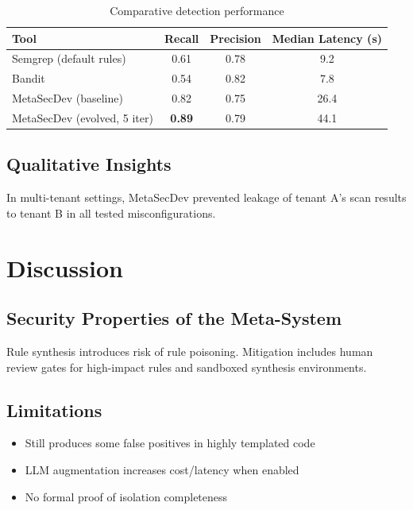 \documentclass[10pt,a4paper]{article}
\begin{document}
\begin{table}[ht]
    \centering
    \caption{Comparative detection performance}
    \begin{tabular}{lccc}
        \toprule
        Tool & Recall & Precision & Median Latency (s) \\
        \midrule
        Semgrep (default rules) & 0.61 & 0.78 & 9.2 \\
        Bandit & 0.54 & 0.82 & 7.8 \\
        MetaSecDev (baseline) & 0.82 & 0.75 & 26.4 \\
        MetaSecDev (evolved, 5 iter) & \textbf{0.89} & 0.79 & 44.1 \\
        \bottomrule
    \end{tabular}
    \label{tab:results}
\end{table}

\subsection{Qualitative Insights}

In multi-tenant settings, MetaSecDev prevented leakage of tenant A’s scan results to tenant B in all tested misconfigurations.

\section{Discussion}

\subsection{Security Properties of the Meta-System}

Rule synthesis introduces risk of rule poisoning. Mitigation includes human review gates for high-impact rules and sandboxed synthesis environments.

\subsection{Limitations}

\begin{itemize}
    \item Still produces some false positives in highly templated code
    \item LLM augmentation increases cost/latency when enabled
    \item No formal proof of isolation completeness
\end{itemize}
\end{document}

